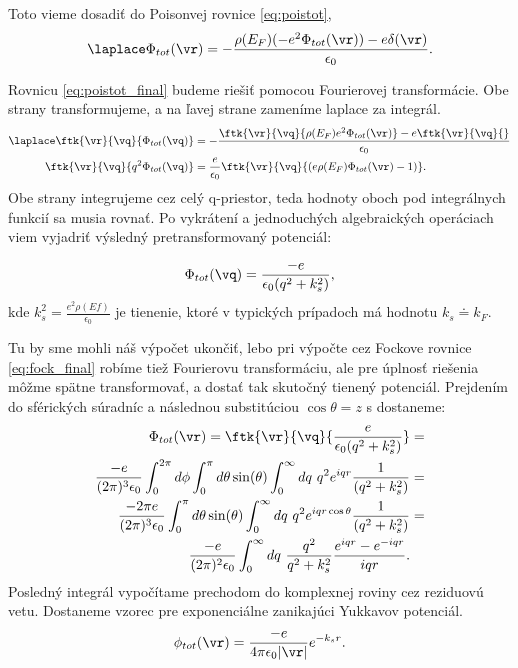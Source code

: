  Toto vieme dosadiť do Poisonvej rovnice \eqref{eq:poistot},
 \begin{equation}
  \label{eq:poistot_final}
   \laplace \Phi_{tot}(\vr)=-\frac{\rho(E_F)(-e^2\Phi_{tot}(\vr))-e\delta(\vr)}{\epsilon_0} \text{.}
 \end{equation} 
 
 Rovnicu \eqref{eq:poistot_final} budeme riešiť pomocou Fourierovej transformácie. Obe strany transformujeme, a na ľavej strane zameníme laplace za integrál.
 \begin{align*}
  \laplace \ftk{\vr}{\vq}{\Phi_{tot}(\vq)}&=-\frac{\ftk{\vr}{\vq}{\rho(E_F) e^2 \Phi_{tot}(\vr)}-e\ftk{\vr}{\vq}{}}{\epsilon_0} \\
    \ftk{\vr}{\vq}{q^2\Phi_{tot}(\vq)}&=\frac{e}{\epsilon_0}{\ftk{\vr}{\vq}{(e\rho(E_F)\Phi_{tot}(\vr)-1)}}\text{.}
 \end{align*} 
 Obe strany integrujeme cez celý q-priestor, teda hodnoty oboch pod integrálnych funkcií sa musia rovnať. Po vykrátení a jednoduchých algebraických operáciach viem vyjadriť
 výsledný pretransformovaný potenciál:
 
 \begin{equation}
  \label{eq:screenpot_FT}
  \Phi_{tot}(\vq)=\frac{-e}{\epsilon_0(q^2+k_s^2)}\text{,}
 \end{equation} 
kde $k_s^2=\frac{e^2 \rho(Ef)}{\epsilon_0}$ je tienenie, ktoré v typických prípadoch má hodnotu $k_s\doteq k_F$.

Tu by sme mohli náš výpočet ukončiť, lebo pri výpočte cez Fockove rovnice \eqref{eq:fock_final} robíme tiež Fourierovu transformáciu,
ale pre úplnosť riešenia môžme spätne transformovať, a dostať tak skutočný tienený potenciál. 
Prejdením do sférických súradníc a následnou substitúciou $\cos{\theta}=z$ s dostaneme:
 \begin{align*}
 \Phi_{tot}(\vr)=\ftk{\vr}{\vq}{\frac{e}{\epsilon_0(q^2+k_s^2)}} &=\\ 
 \frac{-e}{(2\pi)^3\epsilon_0} \int_0^{2\pi}d\phi \int_0^{\pi}d\theta \sin(\theta) \int_0^{\infty} dq\ q^2 e^{iqr} \frac{1}{(q^2+k_s^2)} &= \\ \notag
 \frac{-2\pi e }{(2\pi)^3\epsilon_0} \int_0^{\pi}d\theta \sin(\theta) \int_0^{\infty} dq\ q^2 e^{iqr\cos{\theta}} \frac{1}{(q^2+k_s^2)} &= \\ \notag
\frac{-e}{(2\pi)^2\epsilon_0} \int_0^{\infty} dq\ \frac{q^2}{q^2+k_s^2} \frac{e^{iqr}-e^{-iqr}}{iqr} \text{.}
 \end{align*} 
 Posledný integrál vypočítame prechodom do komplexnej roviny cez reziduovú vetu. Dostaneme vzorec pre exponenciálne zanikajúci Yukkavov potenciál.
 \begin{equation}
  \label{eq:yukav_pot}
  \phi_{tot}(\vr)=\frac{-e}{4\pi\epsilon_0 |\vr| }e^{-k_s r} \text{.}
 \end{equation} 
